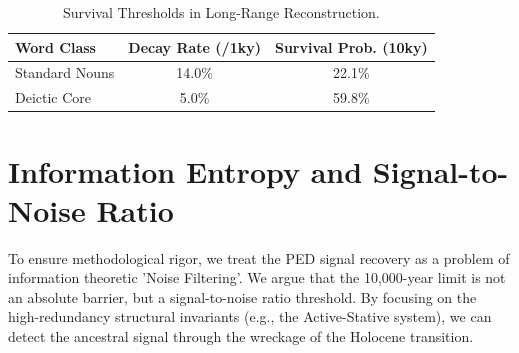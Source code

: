 \begin{table}[h]
\centering
\begin{tabular}{lcc} \toprule
\textbf{Word Class} & \textbf{Decay Rate (/1ky)} & \textbf{Survival Prob. (10ky)} \\ \midrule
Standard Nouns & 14.0\% & 22.1\% \\
Deictic Core & 5.0\% & 59.8\% \\ \bottomrule
\end{tabular}
\caption{Survival Thresholds in Long-Range Reconstruction.}
\end{table}

\section{Information Entropy and Signal-to-Noise Ratio}
To ensure methodological rigor, we treat the PED signal recovery as a problem of information theoretic 'Noise Filtering'. We argue that the 10,000-year limit is not an absolute barrier, but a signal-to-noise ratio threshold. By focusing on the high-redundancy structural invariants (e.g., the Active-Stative system), we can detect the ancestral signal through the wreckage of the Holocene transition.
